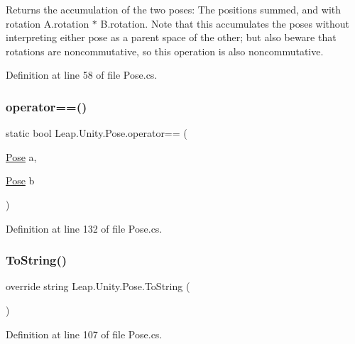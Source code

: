 Returns the accumulation of the two poses\+: The positions summed, and with rotation A.\+rotation $\ast$ B.\+rotation. Note that this accumulates the poses without interpreting either pose as a parent space of the other; but also beware that rotations are noncommutative, so this operation is also noncommutative. 



Definition at line 58 of file Pose.\+cs.

\mbox{\label{struct_leap_1_1_unity_1_1_pose_a0f9beeec0e5acd83e1405ba0915a563f}} 
\subsubsection{\texorpdfstring{operator==()}{operator==()}}
{\footnotesize\ttfamily static bool Leap.\+Unity.\+Pose.\+operator== (\begin{DoxyParamCaption}\item[{\mbox{\hyperlink{struct_leap_1_1_unity_1_1_pose}{Pose}}}]{a,  }\item[{\mbox{\hyperlink{struct_leap_1_1_unity_1_1_pose}{Pose}}}]{b }\end{DoxyParamCaption})\hspace{0.3cm}{\ttfamily [static]}}



Definition at line 132 of file Pose.\+cs.

\mbox{\label{struct_leap_1_1_unity_1_1_pose_a3e16f8168410ebf2585350a36b058a65}} 
\subsubsection{\texorpdfstring{ToString()}{ToString()}\hspace{0.1cm}{\footnotesize\ttfamily [1/2]}}
{\footnotesize\ttfamily override string Leap.\+Unity.\+Pose.\+To\+String (\begin{DoxyParamCaption}{ }\end{DoxyParamCaption})}



Definition at line 107 of file Pose.\+cs.

